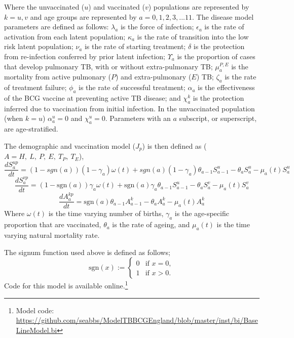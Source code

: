 \documentclass[11pt,twoside]{bristolthesis}
\begin{document}
  Where the unvaccinated (\(u\)) and vaccinated (\(v\)) populations are represented by \(k = u,v\) and age groups are represented by \(a=0,1,2,3, ... 11\). The disease model parameters are defined as follows: \(\lambda_a\) is the force of infection; \(\epsilon_a\) is the rate of activation from each latent population; \(\kappa_a\) is the rate of transition into the low risk latent population; \(\nu_a\) is the rate of starting treatment; \(\delta\) is the protection from re-infection conferred by prior latent infection; \(\Upsilon_a\) is the proportion of cases that develop pulmonary TB, with or without extra-pulmonary TB; \(\mu^{P,E}_a\) is the mortality from active pulmonary (\(P\)) and extra-pulmonary (\(E\)) TB; \(\zeta_a\) is the rate of treatment failure; \(\phi_a\) is the rate of successful treatment; \(\alpha_a\) is the effectiveness of the BCG vaccine at preventing active TB disease; and \(\chi^k_a\) is the protection inferred due to vaccination from initial infection. In the unvaccinated population (when \(k=u\)) \(\alpha^u_a = 0\) and \(\chi^u_a = 0\). Parameters with an \(a\) subscript, or superscript, are age-stratified.
  
  The demographic and vaccination model (\(J_{p}\)) is then defined as (\(A = H,\ L,\ P,\ E,\ T_P,\ T_E\)),
  \begin{equation}
  \frac{dS^{up}_{a}}{dt} = (1 - sgn(a)) (1 - \gamma_a)\omega(t) + sgn(a) (1 - \gamma_a)\theta_{a - 1} S^u_{a - 1} - \theta_a S^u_a -\mu_{a}(t) S^u_a
    \label{eq:sus-age-u-model}
  \end{equation}
  \begin{equation}
  \frac{dS^{vp}_{a}}{dt} = (1 - \text{sgn}(a)) \gamma_a\omega(t) + \text{sgn}(a)\gamma_a\theta_{a - 1} S^u_{a - 1} - \theta_a S^v_a -\mu_{a}(t) S^v_a
    \label{eq:sus-age-v-model}
  \end{equation}
  \begin{equation}
  \frac{dA^{kp}_{a}}{dt} = \text{sgn}(a)\theta_{a - 1} A^k_{a - 1} - \theta_a A^k_{a} - \mu_{a}(t) A^k_{a}
    \label{eq:other-age-model}
  \end{equation}
  Where \(\omega(t)\) is the time varying number of births, \(\gamma_a\) is the age-specific proportion that are vaccinated, \(\theta_a\) is the rate of ageing, and \(\mu_a(t)\) is the time varying natural mortality rate.
  
  The signum function used above is defined as follows;
  \begin{equation}
  \text{sgn}(x) := \begin{cases}
  0 & \text{if } x = 0, \\
  1 & \text{if } x > 0. \end{cases}
    \label{eq:signum}
  \end{equation}
  Code for this model is available online.\footnote{Model code: \url{https://github.com/seabbs/ModelTBBCGEngland/blob/master/inst/bi/BaseLineModel.bi}}
  
\end{document}
